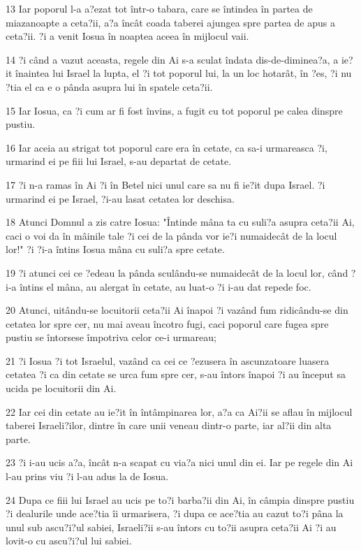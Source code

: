 \par 13 Iar poporul l-a a?ezat tot într-o tabara, care se întindea în partea de miazanoapte a ceta?ii, a?a încât coada taberei ajungea spre partea de apus a ceta?ii. ?i a venit Iosua în noaptea aceea în mijlocul vaii.
\par 14 ?i când a vazut aceasta, regele din Ai s-a sculat îndata dis-de-diminea?a, a ie?it înaintea lui Israel la lupta, el ?i tot poporul lui, la un loc hotarât, în ?es, ?i nu ?tia el ca e o pânda asupra lui în spatele ceta?ii.
\par 15 Iar Iosua, ca ?i cum ar fi fost învins, a fugit cu tot poporul pe calea dinspre pustiu.
\par 16 Iar aceia au strigat tot poporul care era în cetate, ca sa-i urmareasca ?i, urmarind ei pe fiii lui Israel, s-au departat de cetate.
\par 17 ?i n-a ramas în Ai ?i în Betel nici unul care sa nu fi ie?it dupa Israel. ?i urmarind ei pe Israel, ?i-au lasat cetatea lor deschisa.
\par 18 Atunci Domnul a zis catre Iosua: "Întinde mâna ta cu suli?a asupra ceta?ii Ai, caci o voi da în mâinile tale ?i cei de la pânda vor ie?i numaidecât de la locul lor!" ?i ?i-a întins Iosua mâna cu suli?a spre cetate.
\par 19 ?i atunci cei ce ?edeau la pânda sculându-se numaidecât de la locul lor, când ?i-a întins el mâna, au alergat în cetate, au luat-o ?i i-au dat repede foc.
\par 20 Atunci, uitându-se locuitorii ceta?ii Ai înapoi ?i vazând fum ridicându-se din cetatea lor spre cer, nu mai aveau încotro fugi, caci poporul care fugea spre pustiu se întorsese împotriva celor ce-i urmareau;
\par 21 ?i Iosua ?i tot Israelul, vazând ca cei ce ?ezusera în ascunzatoare luasera cetatea ?i ca din cetate se urca fum spre cer, s-au întors înapoi ?i au început sa ucida pe locuitorii din Ai.
\par 22 Iar cei din cetate au ie?it în întâmpinarea lor, a?a ca Ai?ii se aflau în mijlocul taberei Israeli?ilor, dintre în care unii veneau dintr-o parte, iar al?ii din alta parte.
\par 23 ?i i-au ucis a?a, încât n-a scapat cu via?a nici unul din ei. Iar pe regele din Ai l-au prins viu ?i l-au adus la de Iosua.
\par 24 Dupa ce fiii lui Israel au ucis pe to?i barba?ii din Ai, în câmpia dinspre pustiu ?i dealurile unde ace?tia îi urmarisera, ?i dupa ce ace?tia au cazut to?i pâna la unul sub ascu?i?ul sabiei, Israeli?ii s-au întors cu to?ii asupra ceta?ii Ai ?i au lovit-o cu ascu?i?ul lui sabiei.
